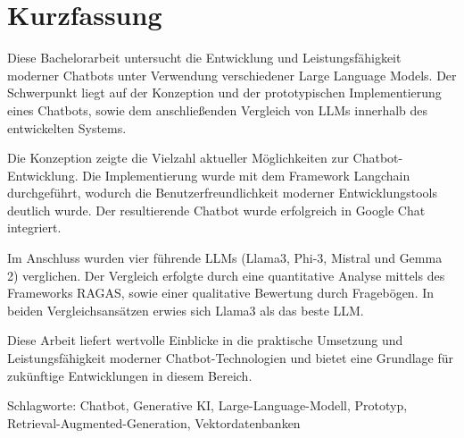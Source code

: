 \chapter*{Kurzfassung}
\thispagestyle{empty}
Diese Bachelorarbeit untersucht die Entwicklung und Leistungsfähigkeit 
moderner Chatbots unter Verwendung verschiedener Large Language Models. 
Der Schwerpunkt liegt auf der Konzeption und der prototypischen 
Implementierung eines Chatbots, sowie dem anschließenden Vergleich von LLMs
innerhalb des entwickelten Systems. \par\par
\bigskip
Die Konzeption zeigte die Vielzahl aktueller 
Möglichkeiten zur Chatbot-Entwicklung. Die Implementierung 
wurde mit dem Framework Langchain durchgeführt, 
wodurch die Benutzerfreundlichkeit moderner Entwicklungstools 
deutlich wurde. Der resultierende Chatbot wurde 
erfolgreich in Google Chat integriert. \par
\bigskip
Im Anschluss wurden vier führende LLMs 
(Llama3, Phi-3, Mistral und Gemma 2) verglichen. 
Der Vergleich erfolgte durch eine quantitative 
Analyse mittels des Frameworks RAGAS, sowie einer
qualitative Bewertung durch Fragebögen. 
In beiden Vergleichsansätzen erwies sich Llama3 
als das beste LLM. \par
\bigskip
Diese Arbeit liefert wertvolle Einblicke in die praktische 
Umsetzung und Leistungsfähigkeit moderner Chatbot-Technologien 
und bietet eine Grundlage für zukünftige Entwicklungen in diesem Bereich.

\bigskip

\noindent
Schlagworte: Chatbot, Generative KI, Large-Language-Modell, Prototyp, 
Retrieval-Augmented-Generation, Vektordatenbanken

